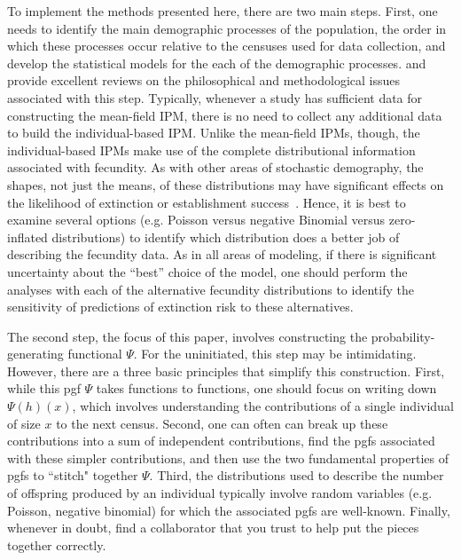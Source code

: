 \documentclass[12pt]{amsart}\usepackage[]{graphicx}\usepackage[]{color}
\begin{document}
To implement the methods presented here, there are two main steps. First, one needs to identify the main demographic processes of the population, the order in which these processes occur relative to the censuses used for data collection, and develop the statistical models for the each of the demographic processes. \citet{rees-etal-14} and \citet{merow-etal-14} provide excellent reviews on the philosophical and methodological issues associated with this step. Typically, whenever a study has sufficient data for constructing the mean-field IPM, there is no need to collect any additional data to build the individual-based IPM.  Unlike the mean-field IPMs, though, the individual-based IPMs make use of the complete distributional information associated with fecundity. As with other areas of stochastic demography, the shapes, not just the means, of these distributions may have significant effects on the likelihood of extinction or establishment success~\citep{nature-05}. Hence, it is best to examine several options (e.g. Poisson versus negative Binomial versus zero-inflated distributions) to identify which distribution does a better job of describing the fecundity data. As in all areas of modeling, if there is significant uncertainty about the ``best'' choice of the model, one should perform the analyses with each of the alternative fecundity distributions to identify the sensitivity of predictions of extinction risk to these alternatives.

The second step, the focus of this paper, involves constructing the probability-generating functional $\Psi$. For the uninitiated, this step may be intimidating. However, there are a three basic principles that simplify this construction. First, while this pgf $\Psi$ takes functions to functions, one should focus on writing down $\Psi(h)(x)$, which involves understanding the contributions of a single individual of size $x$ to the next census. Second, one can often can break up these contributions into a sum of independent contributions, find the pgfs associated with these simpler contributions, and then use the two fundamental properties of pgfs to ``stitch" together $\Psi$. Third, the distributions used to describe the number of offspring produced by an individual typically involve random variables (e.g. Poisson, negative binomial) for which the associated pgfs are well-known. Finally, whenever in doubt, find a collaborator that you trust to help put the pieces together correctly.
\end{document}
